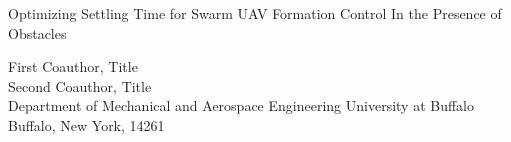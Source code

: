 
\usepackage{graphicx}
\graphicspath{ {./images/} }

\setlength{\oddsidemargin}{1in}
\setlength{\evensidemargin}{1in}
\setlength{\marginparwidth}{0.0in}
\setlength{\topmargin}{0.5in}
\setlength{\headheight}{0in}
\setlength{\headsep}{0in}
\setlength{\textwidth}{4.5in}
\setlength{\textheight}{7.5in}
\setlength{\parindent}{0.25in}
\setlength{\parskip}{0.0in}
\setlength{\baselineskip}{10pt}

	



\begin{center}
{\footnotesize{\hvb
Optimizing Settling Time for Swarm UAV Formation Control In the Presence of Obstacles\\
}}

\vspace{10pt}
{\footnotesize
{\hvb First Coauthor}, {\hv Title} \\
{\hvb Second Coauthor}, {\hv Title} \\
{\hv
Department of Mechanical and Aerospace Engineering
University at Buffalo
Buffalo, New York, 14261
}}
\end{center}






